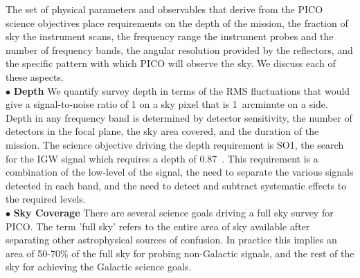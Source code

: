 \documentclass[PICOReport.tex]{subfiles}
\begin{document}
The set of physical parameters and observables that derive from the PICO science objectives place 
requirements on the depth of the mission, the fraction of sky the instrument scans, the frequency range the 
instrument probes and the number of frequency bands, the angular resolution provided by the reflectors, and
the specific pattern with which PICO will observe the sky. We discuss each of these aspects. \\
%
$\bullet$ {\bf Depth} \hspace{0.1in} We quantify survey depth in terms of the RMS fluctuations that would give
a signal-to-noise ratio of 1 on a sky pixel that is 1~arcminute on a side. Depth in any frequency band 
is determined by detector sensitivity, the number of detectors in the focal plane, the sky area covered, and the 
duration of the mission.  The science objective driving 
the depth requirement is SO1, the search for the IGW signal which 
requires a depth of 0.87~\microkamin. This requirement is a combination of the low-level of the signal, the need
to separate the various signals detected in each band, and the need to detect and subtract systematic effects 
to the required levels.  \\
%
$\bullet$ {\bf Sky Coverage} \hspace{0.1in} There are several science goals driving a full sky survey for PICO. The 
term 'full sky' refers to the entire area of sky available after separating other astrophysical sources of confusion. In 
practice this implies an area of 50-70\% of the full sky for probing non-Galactic signals, and the rest of the sky
for achieving the Galactic science goals. \\
\end{document}
